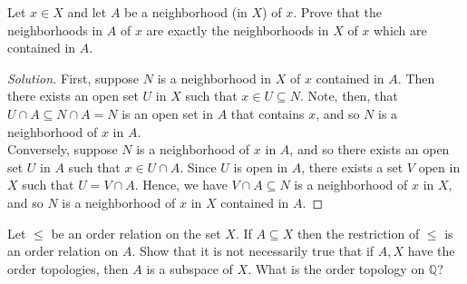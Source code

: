\documentclass[12pt]{article}
\newenvironment{problem}[2][Problem]{\begin{trivlist}
\item[\hskip \labelsep {\bfseries #1}\hskip \labelsep {\bfseries #2.}]}{\end{trivlist}}
\newenvironment{solution}
  {\renewcommand\qedsymbol{$\blacksquare$}\begin{proof}[Solution]}
{\end{proof}}
\begin{document}
\begin{problem}{6}
  Let $x\in X$ and let $A$ be a neighborhood (in $X$) of $x$.
  Prove that the neighborhoods in $A$ of $x$ are exactly the
  neighborhoods in $X$ of $x$ which are contained in $A$.
\end{problem}
\begin{solution}
  First, suppose $N$ is a neighborhood in $X$ of $x$ contained in $A$. 
  Then there exists an open set $U$ in $X$ such that $x\in U\subseteq N$.
  Note, then, that $U\cap A\subseteq N\cap A = N$ is an open set in $A$
  that contains $x$, and so $N$ is a neighborhood of $x$ in $A$.\\
  \indent Conversely, suppose $N$ is a neighborhood of $x$ in $A$, and so
  there exists an open set $U$ in $A$ such that $x\in U\cap A$.
  Since $U$ is open in $A$, there exists a set $V$ open in $X$ such
  that $U=V\cap A$.
  Hence, we have $V\cap A\subseteq N$ is a neighborhood of $x$ in $X$,
  and so $N$ is a neighborhood of $x$ in $X$ contained in $A$.
\end{solution}

\begin{problem}{7}
  Let $\leq$ be an order relation on the set $X$.
  If $A\subseteq X$ then the restriction of $\leq$ is an order relation on $A$.
  Show that it is not necessarily true that if $A,X$ have the order topologies, then $A$
  is a subspace of $X$.
  What is the order topology on $\mathbb{Q}$?
\end{problem}
\end{document}
